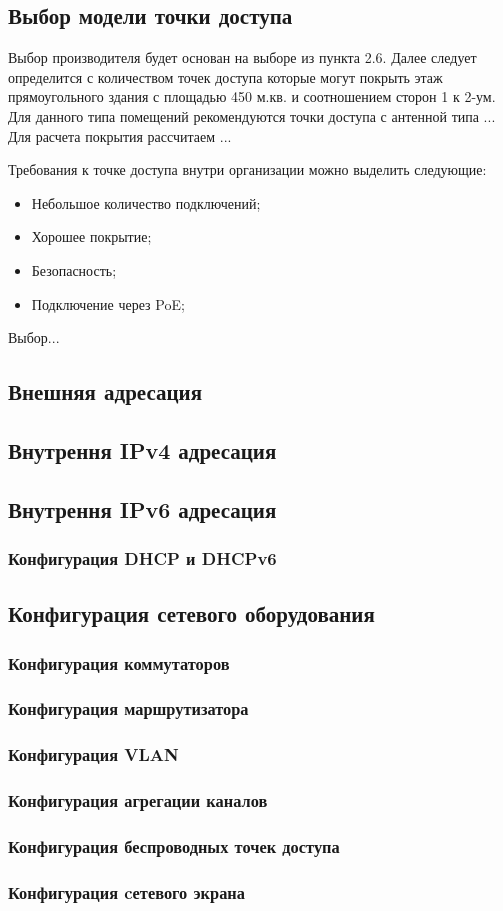\subsection{Выбор модели точки доступа}

Выбор производителя будет основан на выборе из пункта 2.6.
Далее следует определится с количеством точек доступа которые могут покрыть этаж прямоугольного здания
с площадью 450 м.кв. и соотношением сторон 1 к 2-ум. Для данного типа помещений рекомендуются точки доступа с антенной типа ...
Для расчета покрытия рассчитаем ...

Требования к точке доступа внутри организации можно выделить следующие:
\begin{itemize}
    \item Небольшое количество подключений;
    \item Хорошее покрытие;
    \item Безопасность;
    \item Подключение через PoE;
\end{itemize}

Выбор...

\subsection{Внешняя адресация}
\subsection{Внутрення IPv4 адресация}
\subsection{Внутрення IPv6 адресация}
\subsubsection{Конфигурация DHCP и DHCPv6}
\subsection{Конфигурация сетевого оборудования}
\subsubsection{Конфигурация коммутаторов}
\subsubsection{Конфигурация маршрутизатора}
\subsubsection{Конфигурация VLAN}
\subsubsection{Конфигурация агрегации каналов}
\subsubsection{Конфигурация беспроводных точек доступа}
\subsubsection{Конфигурация cетевого экрана}